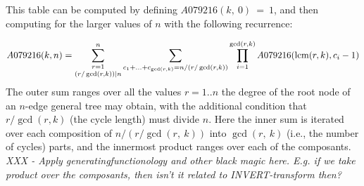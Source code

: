 \documentclass[11pt]{article} %
\newcommand{\eeq}{\end{equation}}
\newcommand{\beql}[1]{\begin{equation}\label{#1}}
\begin{document}


This table can be computed by defining $A079216(k,~0)~=~1$, and
then computing for the larger values of $n$ with the following recurrence:

\beql{EqA079216}
\aligned
A079216(k, n) =
\mathop{\sum_{r=1}^{n}}_{(r/\gcd(r, k))|n}
 \sum_{c_1 + \hdots + c_{\gcd(r,k)} = n/(r/\gcd(r, k))}
 \prod_{i=1}^{\gcd(r,k)} A079216({\rm lcm}(r, k), c_{i}-1)
\endaligned
\eeq
The outer sum ranges over all the values $r=1..n$ the degree
of the root node of an $n$-edge general tree may obtain,
with the additional condition that $r/\gcd(r, k)$ (the cycle length)
must divide $n$.
Here the inner sum is iterated over each composition of
$n/(r/\gcd(r,~k))$ into $\gcd(r,~k)$ (i.e., the number of cycles) parts,
and the innermost product ranges over each of the composants.
{\em XXX - Apply generatingfunctionology and other black magic here.
E.g. if we take product over the composants, then isn't it
related to INVERT-transform then?}
\end{document}
